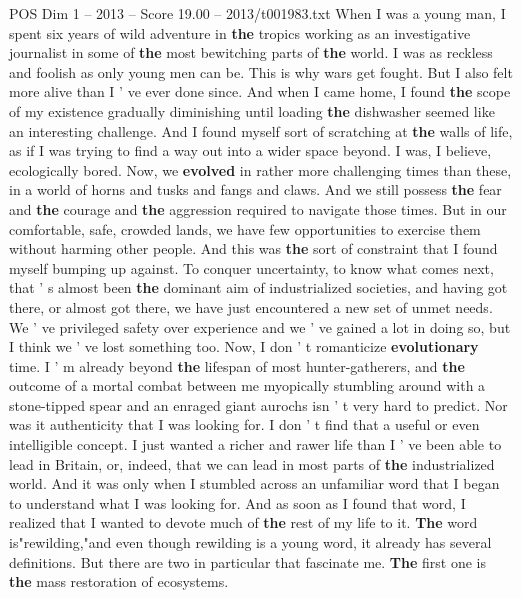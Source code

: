 \begin{textsample}{POS Dim 1 – 2013 – Score 19.00 – 2013/t001983.txt}  \label{ex:f1_pos_044}
When I was a young man, I spent six years of wild adventure in \textbf{the} tropics working as an investigative journalist in some of \textbf{the} most bewitching parts of \textbf{the} world.
I was as reckless and foolish as only young men can be.
This is why wars get fought.
But I also felt more alive than I ' ve ever done since.
And when I came home, I found \textbf{the} scope of my existence gradually diminishing until loading \textbf{the} dishwasher seemed like an interesting challenge.
And I found myself sort of scratching at \textbf{the} walls of life, as if I was trying to find a way out into a wider space beyond.
I was, I believe, ecologically bored.
Now, we \textbf{evolved} in rather more challenging times than these, in a world of horns and tusks and fangs and claws.
And we still possess \textbf{the} fear and \textbf{the} courage and \textbf{the} aggression required to navigate those times.
But in our comfortable, safe, crowded lands, we have few opportunities to exercise them without harming other people.
And this was \textbf{the} sort of constraint that I found myself bumping up against.
To conquer uncertainty, to know what comes next, that ' s almost been \textbf{the} dominant aim of industrialized societies, and having got there, or almost got there, we have just encountered a new set of unmet needs.
We ' ve privileged safety over experience and we ' ve gained a lot in doing so, but I think we ' ve lost something too.
Now, I don ' t romanticize \textbf{evolutionary} time.
I ' m already beyond \textbf{the} lifespan of most hunter-gatherers, and \textbf{the} outcome of a mortal combat between me myopically stumbling around with a stone-tipped spear and an enraged giant aurochs isn ' t very hard to predict.
Nor was it authenticity that I was looking for.
I don ' t find that a useful or even intelligible concept.
I just wanted a richer and rawer life than I ' ve been able to lead in Britain, or, indeed, that we can lead in most parts of \textbf{the} industrialized world.
And it was only when I stumbled across an unfamiliar word that I began to understand what I was looking for.
And as soon as I found that word, I realized that I wanted to devote much of \textbf{the} rest of my life to it. \textbf{The} word is"rewilding,"and even though rewilding is a young word, it already has several definitions.
But there are two in particular that fascinate me. \textbf{The} first one is \textbf{the} mass restoration of ecosystems.

\end{textsample}
